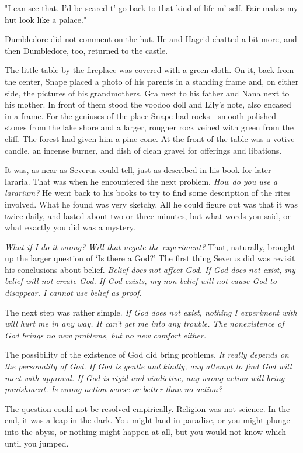 "I can see that. I'd be scared t' go back to that kind of life m' self. Fair makes my hut look like a palace."

Dumbledore did not comment on the hut. He and Hagrid chatted a bit more, and then Dumbledore, too, returned to the castle.

The little table by the fireplace was covered with a green cloth. On it, back from the center, Snape placed a photo of his parents in a standing frame and, on either side, the pictures of his grandmothers, Gra next to his father and Nana next to his mother. In front of them stood the voodoo doll and Lily's note, also encased in a frame. For the geniuses of the place Snape had rocks—smooth polished stones from the lake shore and a larger, rougher rock veined with green from the cliff. The forest had given him a pine cone. At the front of the table was a votive candle, an incense burner, and dish of clean gravel for offerings and libations.

It was, as near as Severus could tell, just as described in his book for later lararia. That was when he encountered the next problem. \emph{How do you use a lararium?} He went back to his books to try to find some description of the rites involved. What he found was very sketchy. All he could figure out was that it was twice daily, and lasted about two or three minutes, but what words you said, or what exactly you did was a mystery.

\emph{What if I do it wrong? Will that negate the experiment?} That, naturally, brought up the larger question of `Is there a God?' The first thing Severus did was revisit his conclusions about belief. \emph{Belief does not affect God. If God does not exist, my belief will not create God. If God exists, my non-belief will not cause God to disappear. I cannot use belief as proof.}

The next step was rather simple. \emph{If God does not exist, nothing I experiment with will hurt me in any way. It can't get me into any trouble. The nonexistence of God brings no new problems, but no new comfort either.}

The possibility of the existence of God did bring problems. \emph{It really depends on the personality of God. If God is gentle and kindly, any attempt to find God will meet with approval. If God is rigid and vindictive, any wrong action will bring punishment. Is wrong action worse or better than no action?}

The question could not be resolved empirically. Religion was not science. In the end, it was a leap in the dark. You might land in paradise, or you might plunge into the abyss, or nothing might happen at all, but you would not know which until you jumped.

